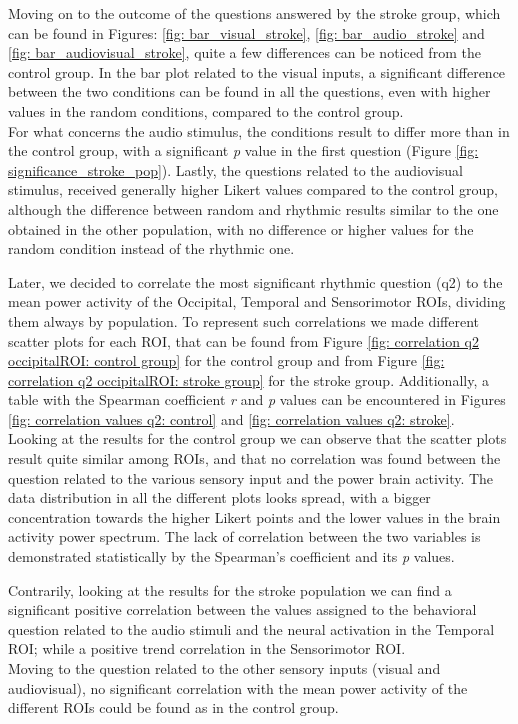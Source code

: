 Moving on to the outcome of the questions answered by the stroke group, which can be found in Figures: \ref{fig: bar_visual_stroke}, \ref{fig: bar_audio_stroke} and \ref{fig: bar_audiovisual_stroke}, quite a few differences can be noticed from the control group. In the bar plot related to the visual inputs, a significant difference between the two conditions can be found in all the questions, even with higher values in the random conditions, compared to the control group. \\
For what concerns the audio stimulus, the conditions result to differ more than in the control group, with a significant \textit{p} value in the first question (Figure \ref{fig: significance_stroke_pop}). Lastly, the questions related to the audiovisual stimulus, received generally higher Likert values compared to the control group, although the difference between random and rhythmic results similar to the one obtained in the other population, with no difference or higher values for the random condition instead of the rhythmic one. 

Later, we decided to correlate the most significant rhythmic question (q2) to the mean power activity of the Occipital, Temporal and Sensorimotor ROIs, dividing them always by population. To represent such correlations we made different scatter plots for each ROI, that can be found from Figure \ref{fig: correlation q2 occipitalROI: control group} for the control group and from Figure \ref{fig: correlation q2 occipitalROI: stroke group} for the stroke group. Additionally, a table with the Spearman coefficient \textit{r} and \textit{p} values can be encountered in Figures \ref{fig: correlation values q2: control} and \ref{fig: correlation values q2: stroke}. \\
Looking at the results for the control group we can observe that the scatter plots result quite similar among ROIs, and that no correlation was found between the question related to the various sensory input and the power brain activity. The data distribution in all the different plots looks spread, with a bigger concentration towards the higher Likert points and the lower values in the brain activity power spectrum. The lack of correlation between the two variables is demonstrated statistically by the Spearman's coefficient and its \textit{p} values. 

Contrarily, looking at the results for the stroke population we can find a significant positive correlation between the values assigned to the behavioral question related to the audio stimuli and the neural activation in the Temporal ROI; while a positive trend correlation in the Sensorimotor ROI. \\
Moving to the question related to the other sensory inputs (visual and audiovisual), no significant correlation with the mean power activity of the different ROIs could be found as in the control group.

